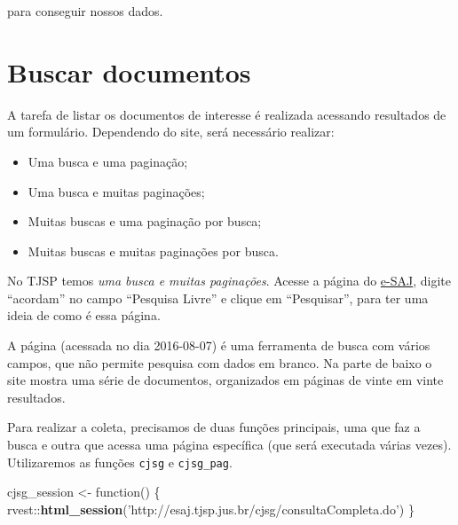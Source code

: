 \documentclass[]{book}
\newenvironment{Shaded}{\begin{snugshade}}{\end{snugshade}}
\newcommand{\KeywordTok}[1]{\textcolor[rgb]{0.13,0.29,0.53}{\textbf{{#1}}}}
\newcommand{\StringTok}[1]{\textcolor[rgb]{0.31,0.60,0.02}{{#1}}}
\newcommand{\NormalTok}[1]{{#1}}
\providecommand{\tightlist}{%
  \setlength{\itemsep}{0pt}\setlength{\parskip}{0pt}}
\begin{document}
para conseguir nossos dados.

\section{Buscar documentos}\label{buscar-documentos}

A tarefa de listar os documentos de interesse é realizada acessando
resultados de um formulário. Dependendo do site, será necessário
realizar:

\begin{itemize}
\tightlist
\item
  Uma busca e uma paginação;
\item
  Uma busca e muitas paginações;
\item
  Muitas buscas e uma paginação por busca;
\item
  Muitas buscas e muitas paginações por busca.
\end{itemize}

No TJSP temos \emph{uma busca e muitas paginações}. Acesse a página do
\href{http://esaj.tjsp.jus.br/cjsg/consultaCompleta.do}{e-SAJ}, digite
``acordam'' no campo ``Pesquisa Livre'' e clique em ``Pesquisar'', para
ter uma ideia de como é essa página.

A página (acessada no dia 2016-08-07) é uma ferramenta de busca com
vários campos, que não permite pesquisa com dados em branco. Na parte de
baixo o site mostra uma série de documentos, organizados em páginas de
vinte em vinte resultados.

Para realizar a coleta, precisamos de duas funções principais, uma que
faz a busca e outra que acessa uma página específica (que será executada
várias vezes). Utilizaremos as funções \texttt{cjsg} e
\texttt{cjsg\_pag}.

\begin{Shaded}
\begin{Highlighting}[]
\NormalTok{cjsg_session <-}\StringTok{ }\NormalTok{function() \{}
  \NormalTok{rvest::}\KeywordTok{html_session}\NormalTok{(}\StringTok{'http://esaj.tjsp.jus.br/cjsg/consultaCompleta.do'}\NormalTok{)}
\NormalTok{\}}
\end{Highlighting}
\end{Shaded}
\end{document}
